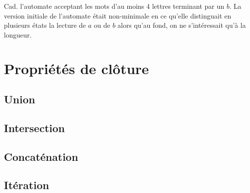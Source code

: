 \begin{correction*}
\begin{figure}[!ht]
\end{figure}

Cad. l'automate acceptant les mots d'au moins 4 lettres terminant par un $b$. La version initiale de l'automate était non-minimale en ce qu'elle distinguait en plusieurs états la lecture de $a$ ou de $b$ alors qu'au fond, on ne s'intéressait qu'à la longueur.

\end{correction*}

\section{Propriétés de clôture}
\label{cloture}
\subsection{Union}

\subsection{Intersection}

\subsection{Concaténation}

\subsection{Itération}

